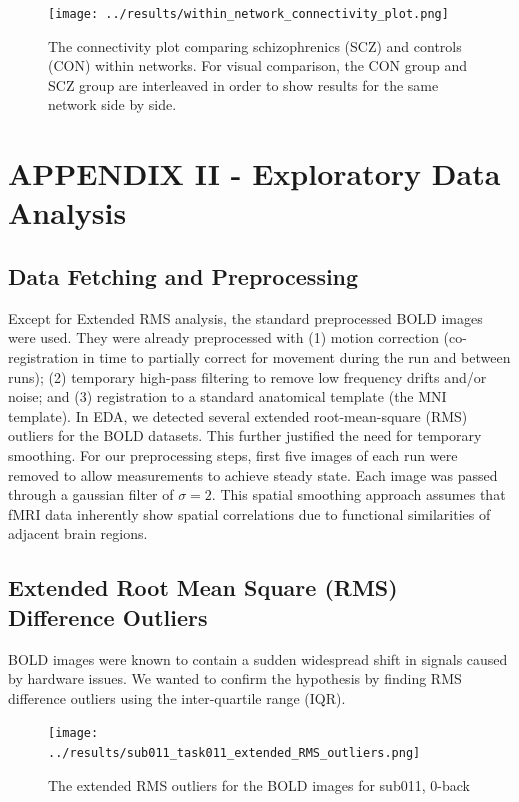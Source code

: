 \documentclass[11pt]{article}
\begin{document}
\begin{figure}[H]
\centering
\texttt{[image: ../results/within\_network\_connectivity\_plot.png]}
\caption{The connectivity plot comparing schizophrenics (SCZ) and controls (CON) within networks. For visual comparison, the CON group and SCZ group are interleaved in order to show results for the same network side by side.}
\end{figure}

\section{APPENDIX II - Exploratory Data Analysis}

\subsection{Data Fetching and Preprocessing}

Except for Extended RMS analysis, the standard preprocessed BOLD images were used. They were already preprocessed with (1) motion correction (co-registration in time to partially correct for movement during the run and between runs); (2) temporary high-pass filtering to remove low frequency drifts and/or noise; and (3) registration to a standard anatomical template (the MNI template). In EDA, we detected several extended root-mean-square (RMS) outliers for the BOLD datasets. This further justified the need for temporary smoothing. For our preprocessing steps, first five images of each run were removed to allow measurements to achieve steady state. Each image was passed through a gaussian filter of $\sigma=2$. This spatial smoothing approach assumes that fMRI data inherently show spatial correlations due to functional similarities of adjacent brain regions.
\subsection{Extended Root Mean Square (RMS) Difference Outliers}

BOLD images were known to contain a sudden widespread shift in signals caused by hardware issues. We
wanted to confirm the hypothesis by finding RMS difference outliers using the inter-quartile range (IQR).

\begin{figure}[H]
\centering
\texttt{[image: ../results/sub011\_task011\_extended\_RMS\_outliers.png]}
\caption{The extended RMS outliers for the BOLD images for sub011, 0-back}
\end{figure} 
\end{document}
